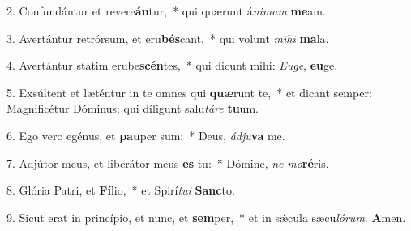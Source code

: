 2. Confundántur et revere\textbf{án}tur,~*  qui quærunt á\textit{ni}\textit{mam} \textbf{me}am.\

3. Avertántur retrórsum, et eru\textbf{bés}cant,~*  qui volunt \textit{mi}\textit{hi} \textbf{ma}la.\

4. Avertántur statim erube\textbf{scén}tes,~*  qui dicunt mihi: \textit{Eu}\textit{ge}, \textbf{eu}ge.\

5. Exsúltent et læténtur in te omnes qui \textbf{quæ}runt te,~*  et dicant semper: Magnificétur Dóminus: qui díligunt salu\textit{tá}\textit{re} \textbf{tu}um.\

6. Ego vero egénus, et \textbf{pau}per sum:~*  Deus, \textit{ád}\textit{ju}\textbf{va} me.\

7. Adjútor meus, et liberátor meus \textbf{es} tu:~*  Dómine, \textit{ne} \textit{mo}\textbf{ré}ris.\

8. Glória Patri, et \textbf{Fí}lio,~*  et Spirí\textit{tu}\textit{i} \textbf{Sanc}to.\

9. Sicut erat in princípio, et nunc, et \textbf{sem}per,~*  et in sǽcula sæcu\textit{ló}\textit{rum}. \textbf{A}men.\

